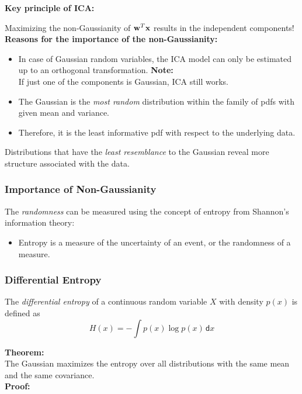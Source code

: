  \textbf {Key principle of ICA:}         

  Maximizing the non-Gaussianity of $\bm{\mathrm{w}}^T \bm{\mathrm{x}}$ results in the independent components!\\[0.3cm]

 \textbf {Reasons for the importance of the non-Gaussianity:}             
 \begin{itemize}
    \item In case of Gaussian random variables, the ICA model can only be estimated up to an orthogonal transformation.                 
     \textbf{Note:}\\
      \quad If just one of the components is Gaussian, ICA still works.                             
    \item The Gaussian is the \textit{most random} distribution within the family of pdfs with given mean and variance.             
    \item Therefore, it is the least informative pdf with respect to the underlying data.
  \end{itemize}
  
  Distributions that have the \textit{least resemblance} to the Gaussian reveal more structure associated with the data.
 
\subsubsection{Importance of Non-Gaussianity}
  The \textit{randomness} can be measured using the concept of entropy from Shannon's information theory:
  \begin{itemize}
    \item Entropy is a measure of the uncertainty of an event, or the randomness of a measure.
  \end{itemize}
  \vspace{0.5\baselineskip}

\subsubsection{Differential Entropy}
  
  The \textit{differential entropy} of a continuous random variable $X$ with density $p(x)$ is defined as
    \begin{displaymath}
      H(x) = - \int p(x) \log p(x) \,\mathsf{d}x
    \end{displaymath}
  
\textbf{Theorem:}\\
    The Gaussian maximizes the entropy over all distributions with the same mean and the same covariance.\\
 \textbf {Proof:}   \\         

